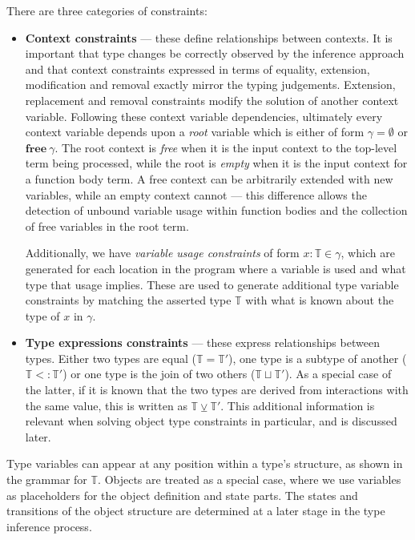 \documentclass[preprint]{sigplanconf}
\newcommand{\free}[1]{\mathbf{free}\:#1}
\newcommand{\tinf}{\mathbb{T}}
\begin{document}
There are three categories of constraints:

\begin{itemize}
\item {\bf Context constraints} --- these define relationships between contexts.
It is important that type changes be correctly observed by the inference
approach and that context constraints expressed in terms of equality, extension,
modification and removal exactly mirror the typing judgements. 
Extension, replacement and removal constraints modify the solution of
another context variable. Following these context variable dependencies,
ultimately every context variable depends upon a {\it root} variable which
is either of form $\gamma = \emptyset$ or $\free{\gamma}$. The root
context is {\it free} when it is the input context to the top-level term being
processed, while
the root is {\it empty} when it is the input context for a function body term.
A free context can be arbitrarily extended with new variables, while an
empty context cannot --- this difference allows the detection of unbound
variable usage within function bodies and the collection of free variables
in the root term.

Additionally, we have {\it variable usage constraints} of form 
$x : \tinf \in \gamma$, which are generated for each location in the
program where a variable is used and what type that usage implies. These
are used to generate additional type variable
constraints by matching the asserted type $\tinf$ with what is known
about the type of $x$ in $\gamma$.

\item {\bf Type expressions constraints} --- these express 
relationships between types. Either two types are equal ($\tinf = \tinf'$),
one type is a subtype of another ($\tinf <: \tinf'$) or one type
is the join of two others ($\tinf \sqcup \tinf'$). As a special case of
the latter, if it is known that the two types are derived from
interactions with the same value, this is written as $\tinf \veebar \tinf'$.
This additional information is relevant when solving object type constraints
in particular, and is discussed later.
\end{itemize}

Type variables can appear at any position within a type's structure, as shown
in the grammar for $\tinf$. Objects are treated as a special case, where
we use variables as placeholders for the object definition and state parts.
The states and transitions of the object structure are determined at a later
stage in the type inference process.
\end{document}
